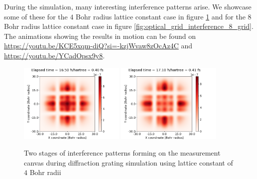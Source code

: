 During the simulation, many interesting interference patterns arise.
We showcase some of these for the $4$ Bohr radius lattice constant case in figure \ref{fig:optical_grid_interference} and for the $8$ Bohr radius lattice constant case in figure \ref{fig:optical_grid_interference_8_grid}.
The animations showing the results in motion can be found on \url{https://youtu.be/KCE5xqm-diQ?si=-kzjWvaw8zOcAz4C} and \url{https://youtu.be/YCadOpsx9y8}.
\begin{figure}[hbtp!]
	\begin{center}
		\includegraphics[width=0.45\textwidth]{figures/optical_grid_interference_01.png}
		\includegraphics[width=0.45\textwidth]{figures/optical_grid_interference_02.png}
		\caption{Two stages of interference patterns forming on the measurement canvas during diffraction grating simulation using lattice constant of $4$ Bohr radii}
		\label{fig:optical_grid_interference}
	\end{center}	
\end{figure}
